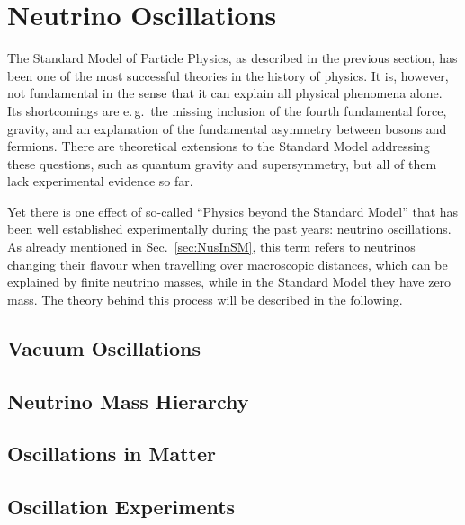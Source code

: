 \section{Neutrino Oscillations}
\label{sec:osc}

The Standard Model of Particle Physics, as described in the previous section,
has been one of the most successful theories in the history of physics. It is,
however, not fundamental in the sense that it can explain all physical
phenomena alone. Its shortcomings are e.\,g.\ the missing inclusion of the
fourth fundamental force, gravity, and an explanation of the fundamental
asymmetry between bosons and fermions.
There are theoretical extensions to the Standard Model addressing these
questions, such as quantum gravity\cite{QuantumGravity} and
supersymmetry\cite{SUSY}, but all of them lack experimental evidence so far.

Yet there is one effect of so-called ``Physics beyond the Standard Model'' that
has been well established experimentally during the past years: neutrino
oscillations. As already mentioned in Sec.~\ref{sec:NusInSM}, this term refers
to neutrinos changing their flavour when travelling over macroscopic distances,
which can be explained by finite neutrino masses, while in the Standard Model
they have zero mass. The theory behind this process will be described in the
following.

\subsection{Vacuum Oscillations}
\label{sec:VacOsc}


\subsection{Neutrino Mass Hierarchy}
\label{sec:NMH}


\subsection{Oscillations in Matter}
\label{sec:MSW}


\subsection{Oscillation Experiments}
\label{sec:OscExp}
